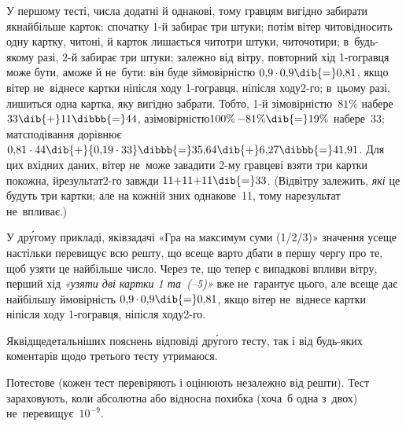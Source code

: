\Notes
У першому тесті, 
числа додатні й 
однакові, тому гравцям вигідно забирати якнайбільше 
карток: 
спочатку \mbox{1-й} забирає три штуки;
потім вітер чи\nolinebreak[3] то\nolinebreak[3] відносить одну картку, чи\nolinebreak[3] то\nolinebreak[3] ні, й карток лишається чи\nolinebreak[3] то\nolinebreak[3] три штуки, чи\nolinebreak[3] то\nolinebreak[3] чотири;
в~будь-якому разі, \mbox{2-й} забирає три штуки;
залежно від вітру, повторний хід \mbox{1-го}\nolinebreak[2] гравця може бути, а\nolinebreak[3] може й не~бути: він буде з\nolinebreak[3] ймовірністю ${0{,}9\,{\cdot}\,0{,}9}\dib{{=}}0{,}81$,
якщо вітер не~віднесе картки ні\nolinebreak[3] після ходу \mbox{1-го}\nolinebreak[2] гравця, ні\nolinebreak[3] після ходу\nolinebreak[2] \mbox{2-го}; в~цьому разі, лишиться одна картка, яку вигідно забрати. Тобто, \mbox{1-й} з\nolinebreak[3] імовірністю~$81\%$ набере\nolinebreak[2] $33\dib{{+}}11\dibbb{{=}}44$, а\nolinebreak[3] з\nolinebreak[3] імовірністю\nolinebreak[2] ${100\%\,{-}81\%}\dib{{=}}19\%$ набере~$33$; матсподівання дорівнює ${0{,}81\cdot44}\dib{{+}}{0{,}19\cdot33}\dibbb{{=}}35{,}64\dib{{+}}6{,}27\dibbb{{=}}41{,}91$.
Для цих вхідних даних, вітер не~може завадити \mbox{2-му} гравцеві взяти три картки по\nolinebreak[3] кожна, й\nolinebreak[3] результат\nolinebreak[3] \mbox{2-го} завжди ${11{+}11{+}11}\dib{{=}}33$. 
(Від\nolinebreak[2] вітру залежить, \emph{які} це будуть три картки; але на кожній з\nolinebreak[3] них %
однакове~11, тому на\nolinebreak[3] результат не~впливає.)


У др\'{у}гому прикладі, як\nolinebreak[3] і\nolinebreak[2] в\nolinebreak[3] задачі\nolinebreak[3] 
«Гра на максимум суми (1/2/3)»
значення усе\nolinebreak[3] ще настільки перевищує всю решту, що все\nolinebreak[3] ще варто дбати в першу чергу про те, щоб узяти це найбільше число.
Через те, що тепер є випадкові впливи вітру, перший хід \textsl{«узяти дві картки 1 та~\mbox{(–5)}»} вже не~гарантує цього, але все\nolinebreak[3] ще дає найбільшу ймовірність ${0{,}9\,{\cdot}\,0{,}9}\dib{{=}}0{,}81$,
якщо вітер не~віднесе картки ні\nolinebreak[3] після ходу \mbox{1-го}\nolinebreak[2] гравця, ні\nolinebreak[3] після ходу\nolinebreak[2] \mbox{2-го}. 

Як\nolinebreak[2] від\nolinebreak[2] ще\nolinebreak[3] детальніших пояснень відповіді др\'{у}\-гого тесту, так і від будь-яких коментарів щодо третього тесту утримаюся.

\Scoring
Потестове (кожен тест перевіряють і оцінюють неза\-леж\-но від решти).
Тест зараховують, коли абсолютна або відносна похибка (хоча~б одна з~двох) не~перевищує~$10^{-9}$.

